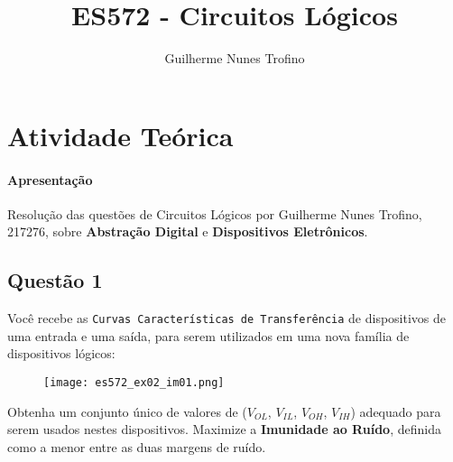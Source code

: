 \documentclass{article}
\title{ES572 - Circuitos Lógicos}
\author{Guilherme Nunes Trofino}
\begin{document}
    \maketitle
\newpage

    \section{Atividade Teórica}
        \paragraph{Apresentação}Resolução das questões de Circuitos Lógicos por Guilherme Nunes Trofino, 217276, sobre \textbf{Abstração Digital} e \textbf{Dispositivos Eletrônicos}.

        \subsection{Questão 1}
            \begin{exercise}
                Você recebe as \texttt{Curvas Características de Transferência} de dispositivos de uma entrada e uma saída, para serem utilizados em uma nova família de dispositivos lógicos:
                    \begin{figure}[H]
                        \centering
                        \texttt{[image: es572\_ex02\_im01.png]}
                    \end{figure} \noindent
                Obtenha um conjunto único de valores de ($V_{OL}$, $V_{IL}$, $V_{OH}$, $V_{IH}$) adequado para serem usados nestes dispositivos. Maximize a \textbf{Imunidade ao Ruído}, definida como a menor entre as duas margens de ruído.
            \end{exercise}
\end{document}
